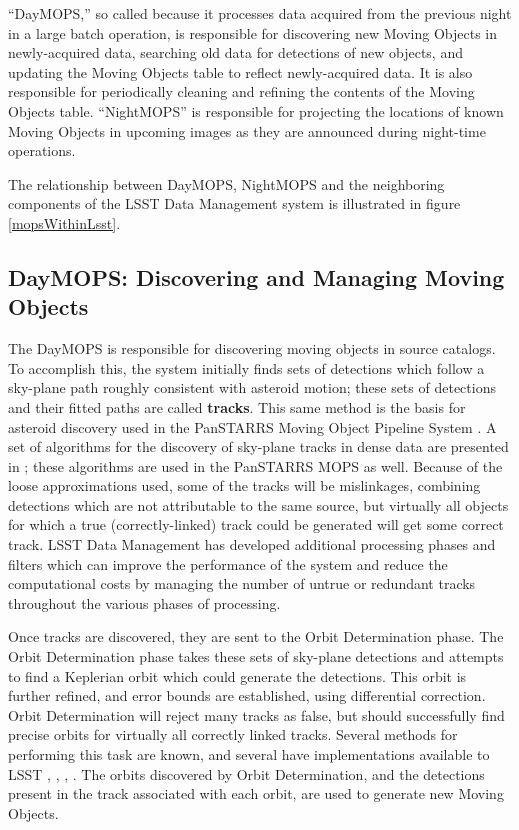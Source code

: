 \documentclass[12pt,preprint]{aastex}
\begin{document}
``DayMOPS,'' so called because it processes data acquired from the
previous night in a large batch operation, is responsible for
discovering new Moving Objects in newly-acquired data, searching old
data for detections of new objects, and updating the Moving Objects
table to reflect newly-acquired data. It is also responsible for
periodically cleaning and refining the contents of the Moving Objects
table.  ``NightMOPS'' is responsible for projecting the locations of known
Moving Objects in upcoming images as they are announced during
night-time operations.  

The relationship between DayMOPS, NightMOPS and the neighboring
components of the LSST Data Management system is illustrated in
figure \ref{mopsWithinLsst}.

\subsection{DayMOPS: Discovering and Managing Moving Objects}



The DayMOPS is responsible for discovering moving objects in source
catalogs.  To accomplish this, the system initially finds sets of
detections which follow a sky-plane path roughly consistent with
asteroid motion; these sets of detections and their fitted paths are
called \textbf{tracks}.  This same method is the basis for asteroid
discovery used in the PanSTARRS Moving Object Pipeline System
\citep{psMOPSDesign}.  A set of algorithms for the discovery of
sky-plane tracks in dense data are presented in
\citet{Kubica:2005:MTA:1081870.1081889}; these algorithms are used in
the PanSTARRS MOPS as well.  Because of the loose approximations used,
some of the tracks will be mislinkages, combining detections which are
not attributable to the same source, but virtually all objects for
which a true (correctly-linked) track could be generated will get some
correct track.  LSST Data Management has developed additional
processing phases and filters which can improve the performance of the
system and reduce the computational costs by managing the number of
untrue or redundant tracks throughout the various phases of
processing.

Once tracks are discovered, they are sent to the Orbit Determination
phase. The Orbit Determination phase takes these sets of sky-plane
detections and attempts to find a Keplerian orbit which could generate
the detections.  This orbit is further refined, and error bounds are
established, using differential correction.  Orbit Determination will
reject many tracks as false, but should successfully find precise
orbits for virtually all correctly linked tracks.  Several methods for
performing this task are known, and several have implementations
available to LSST \citep{Milani04orbitdetermination},
\citep{Milani2006}, \citep{OpenOrb2009}, \citep{granvik_thesis}.  The
orbits discovered by Orbit Determination, and the detections present
in the track associated with each orbit, are used to generate new
Moving Objects.
\end{document}
